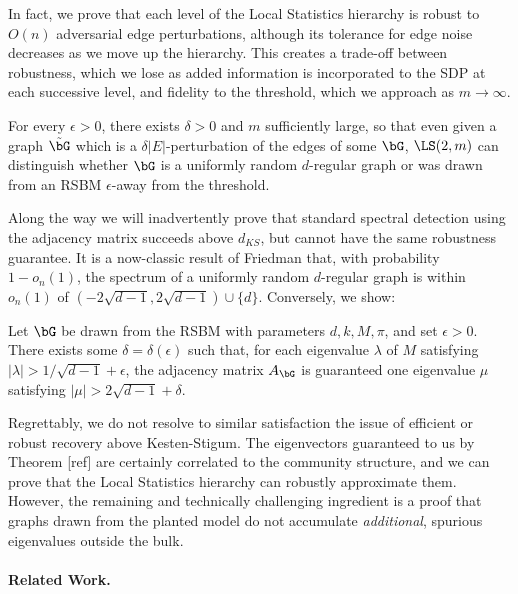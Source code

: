 In fact, we prove that each level of the Local Statistics hierarchy is robust to $O(n)$ adversarial edge perturbations, although its tolerance for edge noise decreases as we move up the hierarchy. This creates a trade-off between robustness, which we lose as added information is incorporated to the SDP at each successive level, and fidelity to the threshold, which we approach as $m\to\infty$.

\begin{theorem}
For every $\epsilon > 0$, there exists $\delta > 0$ and $m$ sufficiently large, so that even given a graph $\tilde{\bG}$ which is a $\delta|E|$-perturbation of the edges of some $\bG$, $\LS(2,m)$ can distinguish whether $\bG$ is a uniformly random $d$-regular graph or was drawn from an RSBM $\epsilon$-away from the threshold.
\end{theorem}

Along the way we will inadvertently prove that standard spectral detection using the adjacency matrix succeeds above $d_{KS}$, but cannot have the same robustness guarantee.  It is a now-classic result of Friedman that, with probability $1 - o_n(1)$, the spectrum of a uniformly random $d$-regular graph is within $o_n(1)$ of $(-2\sqrt{d-1},2\sqrt{d-1})\cup\{d\}$. Conversely, we show:

\begin{corollary}
	Let $\bG$ be drawn from the RSBM with parameters $d,k,M,\pi$, and set $\epsilon > 0$. There exists some $\delta = \delta(\epsilon)$ such that, for each eigenvalue $\lambda$ of $M$ satisfying $|\lambda| > 1/\sqrt{d-1} + \epsilon$, the adjacency matrix $A_{\bG}$  is guaranteed one eigenvalue $\mu$ satisfying $|\mu| > 2\sqrt{d-1} + \delta$.
\end{corollary}

Regrettably, we do not resolve to similar satisfaction the issue of efficient or robust recovery above Kesten-Stigum. The eigenvectors guaranteed to us by Theorem [ref] are certainly correlated to the community structure, and we can prove that the Local Statistics hierarchy can robustly approximate them. However, the remaining and technically challenging ingredient is a proof that graphs drawn from the planted model do not accumulate \emph{additional}, spurious eigenvalues outside the bulk.

\paragraph{Related Work.}

